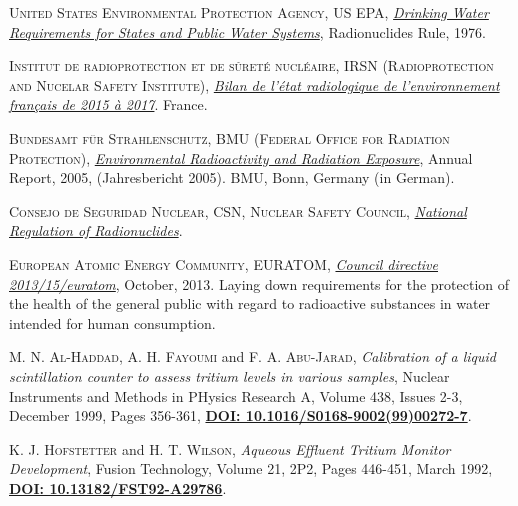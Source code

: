 \begin{thebibliography}{100}
 \textsc{United States Environmental Protection Agency, US EPA},
\href{https://www.epa.gov/dwreginfo/radionuclides-rule}{\textit{Drinking Water Requirements for States and Public Water Systems}}, Radionuclides Rule, 1976. 

 \textsc{Institut de radioprotection et de sûreté nucléaire, IRSN (Radioprotection and Nucelar Safety Institute)},
\href{https://www.google.com/url?sa=t&rct=j&q=&esrc=s&source=web&cd=&ved=2ahUKEwiskum8mYLwAhXLB2MBHWLgAkoQFjAAegQIBBAD&url=https\%3A\%2F\%2Fwww.actu-environnement.com\%2Fmedia\%2Fpdf\%2Fnews-32705-bilan.pdf&usg=AOvVaw0oCSJP78IgV1Tek0T4_6z1}{\textit{Bilan de l’état radiologique  de l’environnement français  de 2015 à 2017}}. France. 

 \textsc{Bundesamt für Strahlenschutz, BMU (Federal Office for Radiation Protection)},
\href{http://doris.bfs.de/jspui/handle/urn:nbn:de:0221-20100331990}{\textit{ Environmental Radioactivity and Radiation Exposure}}, Annual Report, 2005, (Jahresbericht 2005). BMU, Bonn, Germany (in German). 

 \textsc{Consejo de Seguridad Nuclear, CSN, Nuclear Safety Council},
\href{https://www.csn.es/en/normativa-del-csn/normativa-espanola}{\textit{National Regulation of Radionuclides}}. 

 \textsc{European Atomic Energy Community, EURATOM},
\href{https://eur-lex.europa.eu/eli/dir/2013/59/oj}{\textit{Council directive 2013/15/euratom}}, October, 2013. Laying down requirements for the protection of the health of the general public with regard to radioactive substances in water intended for human consumption. 

 \textsc{M. N. Al-Haddad}, \textsc{A. H. Fayoumi} and \textsc{F. A. Abu-Jarad},
\textit{Calibration of a liquid scintillation counter to assess tritium levels in various samples}, Nuclear Instruments and Methods in PHysics Research A, Volume 438, Issues 2-3, December 1999, Pages 356-361, \href{https://doi.org/10.1016/S0168-9002(99)00272-7}{\textbf{DOI: 10.1016/S0168-9002(99)00272-7}}.

 \textsc{K. J. Hofstetter} and \textsc{H. T. Wilson},
\textit{Aqueous Effluent Tritium Monitor Development}, Fusion Technology, Volume 21, 2P2, Pages 446-451, March 1992, \href{https://doi.org/10.13182/FST92-A29786}{\textbf{DOI: 10.13182/FST92-A29786}}.


\end{thebibliography}
